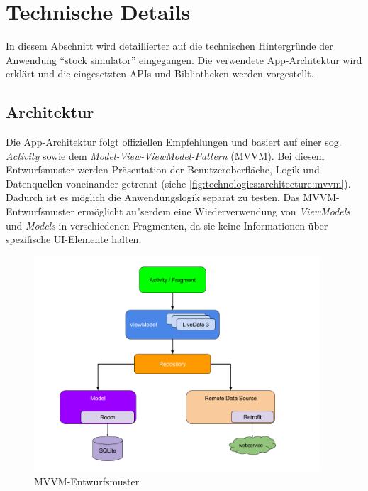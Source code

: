 \documentclass[a4paper]{article}
\begin{document}
\section{Technische Details}
\label{sec:technologies}
In diesem Abschnitt wird detaillierter auf die technischen Hintergründe der Anwendung ``stock simulator'' eingegangen. Die verwendete App-Architektur wird erklärt und die eingesetzten APIs und Bibliotheken werden vorgestellt.


\subsection{Architektur}
\label{subsec:technologies:architecture}
Die App-Architektur folgt offiziellen Empfehlungen \autocite{google_recommendations} und basiert auf einer sog. \textit{Activity} sowie dem \textit{Model-View-ViewModel-Pattern} (MVVM).
Bei diesem Entwurfsmuster werden Präsentation der Benutzeroberfläche, Logik und Datenquellen voneinander getrennt (siehe \autoref{fig:technologies:architecture:mvvm}).
Dadurch ist es möglich die Anwendungslogik separat zu testen.
Das MVVM-Entwurfsmuster ermöglicht au"serdem eine Wiederverwendung von \textit{ViewModels} und \textit{Models} in verschiedenen Fragmenten, da sie keine Informationen über spezifische UI-Elemente halten.

\begin{figure}[H]
	\centering
	\includegraphics[height=8cm,keepaspectratio]{./images/mvvm-architecture.png}
	\caption{MVVM-Entwurfsmuster \autocite{mvvm_architecture}}
	\label{fig:technologies:architecture:mvvm}
\end{figure}
\end{document}
